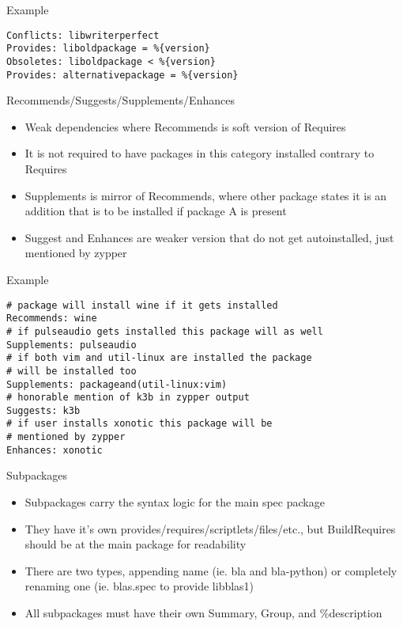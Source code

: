 \documentclass{beamer}
\begin{document}
\begin{frame}[fragile]{Example}
	\begin{small}
	\begin{verbatim}
Conflicts: libwriterperfect
Provides: liboldpackage = %{version}
Obsoletes: liboldpackage < %{version}
Provides: alternativepackage = %{version}
	\end{verbatim}
	\end{small}
\end{frame}

\begin{frame}[t]{Recommends/Suggests/Supplements/Enhances}
	\begin{itemize}
	\item Weak dependencies where Recommends is soft version of Requires
    \item It is not required to have packages in this category installed contrary to Requires
    \item Supplements is mirror of Recommends, where other package states it is an addition that is to be installed if package A is present
    \item Suggest and Enhances are weaker version that do not get autoinstalled, just mentioned by zypper
	\end{itemize}
\end{frame}

\begin{frame}[fragile]{Example}
	\begin{small}
	\begin{verbatim}
# package will install wine if it gets installed
Recommends: wine
# if pulseaudio gets installed this package will as well
Supplements: pulseaudio
# if both vim and util-linux are installed the package
# will be installed too
Supplements: packageand(util-linux:vim)
# honorable mention of k3b in zypper output
Suggests: k3b
# if user installs xonotic this package will be
# mentioned by zypper
Enhances: xonotic
	\end{verbatim}
	\end{small}
\end{frame}

\begin{frame}[t]{Subpackages}
	\begin{itemize}
	\item Subpackages carry the syntax logic for the main spec package
    \item They have it's own provides/requires/scriptlets/files/etc., but BuildRequires should be at the main package for readability
    \item There are two types, appending name (ie. bla and bla-python) or completely renaming one (ie. blas.spec to provide libblas1)
    \item All subpackages must have their own Summary, Group, and \%description
	\end{itemize}
\end{frame}
\end{document}
